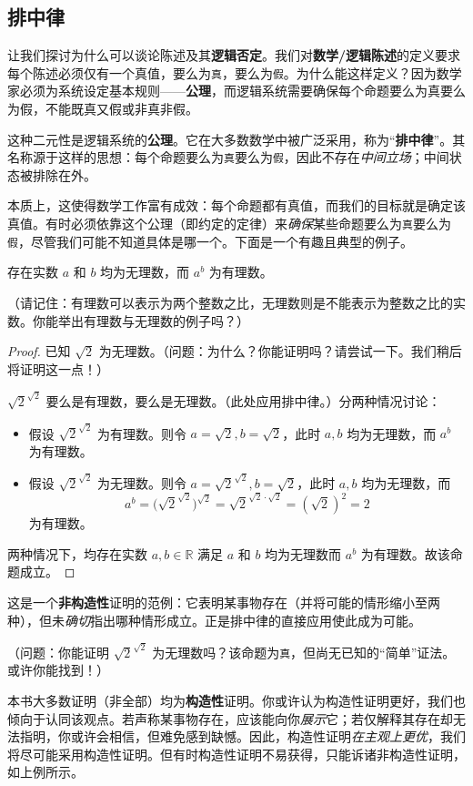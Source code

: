 \subsection{排中律}

让我们探讨为什么可以谈论陈述及其\textbf{逻辑否定}。我们对\textbf{数学/逻辑陈述}的定义要求每个陈述必须仅有一个真值，要么为\verb|真|，要么为\verb|假|。为什么能这样定义？因为数学家必须为系统设定基本规则——\textbf{公理}，而逻辑系统需要确保每个命题要么为真要么为假，不能既真又假或非真非假。

这种二元性是逻辑系统的\textbf{公理}。它在大多数数学中被广泛采用，称为``\textbf{排中律}''。其名称源于这样的思想：每个命题要么为\verb|真|要么为\verb|假|，因此不存在\emph{中间立场}；中间状态被排除在外。

本质上，这使得数学工作富有成效：每个命题都有真值，而我们的目标就是确定该真值。有时必须依靠这个公理（即约定的定律）来\emph{确保}某些命题要么为\verb|真|要么为\verb|假|，尽管我们可能不知道具体是哪一个。下面是一个有趣且典型的例子。

\begin{proposition}
    存在实数 $a$ 和 $b$ 均为无理数，而 $a^b$ 为有理数。
\end{proposition}

（请记住：有理数可以表示为两个整数之比，无理数则是不能表示为整数之比的实数。你能举出有理数与无理数的例子吗？）

\begin{proof}
    已知 $\sqrt{2}$ 为无理数。（问题：为什么？你能证明吗？请尝试一下。我们稍后将证明这一点！）

    $\sqrt{2}^{\sqrt{2}}$ 要么是有理数，要么是无理数。（此处应用排中律。）分两种情况讨论：
    \begin{itemize}
        \item 假设 $\sqrt{2}^{\sqrt{2}}$ 为有理数。则令 $a=\sqrt{2}, b=\sqrt{2}$，此时 $a, b$ 均为无理数，而 $a^b$ 为有理数。
        \item 假设 $\sqrt{2}^{\sqrt{2}}$ 为无理数。则令 $a=\sqrt{2}^{\sqrt{2}}, b=\sqrt{2}$，此时 $a, b$ 均为无理数，而
        \[a^b = \big(\sqrt{2}^{\sqrt{2}}\big)^{\sqrt{2}} = \sqrt{2}^{\sqrt{2} \cdot \sqrt{2}} = (\sqrt{2})^2 = 2\]
        为有理数。
    \end{itemize}
    两种情况下，均存在实数 $a, b \in \mathbb{R}$ 满足 $a$ 和 $b$ 均为无理数而 $a^b$ 为有理数。故该命题成立。
\end{proof}

这是一个\textbf{非构造性}证明的范例：它表明某事物存在（并将可能的情形缩小至两种），但未\emph{确切}指出哪种情形成立。正是排中律的直接应用使此成为可能。

（问题：你能证明 $\sqrt{2}^{\sqrt{2}}$ 为无理数吗？该命题为\verb|真|，但尚无已知的``简单''证法。或许你能找到！）

本书大多数证明（非全部）均为\textbf{构造性}证明。你或许认为构造性证明更好，我们也倾向于认同该观点。若声称某事物存在，应该能向你\emph{展示}它；若仅解释其存在却无法指明，你或许会相信，但难免感到缺憾。因此，构造性证明\emph{在主观上更优}，我们将尽可能采用构造性证明。但有时构造性证明不易获得，只能诉诸非构造性证明，如上例所示。
